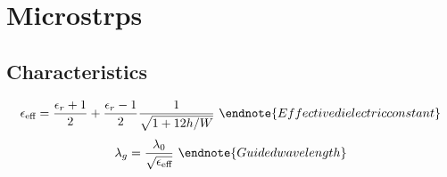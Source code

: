 \section{Microstrps}
\subsection{Characteristics}
\begin{multicols}{3} \noindent
	$$ \epsilon_\text{eff} = \frac{\epsilon_r + 1}{2} + \frac{\epsilon_r - 1}{2} \frac{1}{\sqrt{1 + 12 h/W}} \
		\endnote{Effective dielectric constant}
		$$
	$$ \lambda_g = \frac{\lambda_0}{\sqrt{\epsilon_\text{eff}}} \
		\endnote{Guided wavelength}
		$$
\end{multicols}


\printendnotes[itemize]
